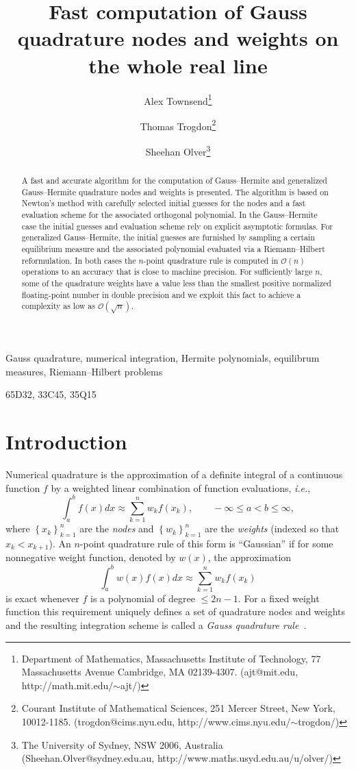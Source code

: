 \documentclass[final]{siamltex}
\title{Fast computation of Gauss quadrature nodes and weights on the whole real line}
\author{Alex Townsend\thanks{Department of Mathematics, Massachusetts Institute of Technology, 77 Massachusetts Avenue
Cambridge, MA 02139-4307. (ajt@mit.edu, http://math.mit.edu/$\sim$ajt/)}
\and Thomas Trogdon\thanks{Courant Institute of Mathematical Sciences, 251 Mercer Street, New York, 10012-1185. 
(trogdon@cims.nyu.edu, http://www.cims.nyu.edu/$\sim$trogdon/)} \and 
Sheehan Olver\thanks{The University of Sydney, NSW 2006, Australia (Sheehan.Olver@sydney.edu.au, http://www.maths.usyd.edu.au/u/olver/)  }
}
\begin{document}
\maketitle

\begin{abstract} 
A fast and accurate algorithm for the computation of Gauss--Hermite and generalized Gauss--Hermite quadrature nodes and weights is presented. The algorithm is based on 
Newton's method with carefully selected initial guesses for the nodes and a fast evaluation scheme for the associated orthogonal polynomial.  
In the Gauss--Hermite case the initial guesses and evaluation scheme rely on explicit asymptotic formulas. For generalized Gauss--Hermite, the 
initial guesses are furnished by sampling a certain equilibrium measure and the associated polynomial
evaluated via a Riemann--Hilbert reformulation. In both cases the $n$-point quadrature rule
is computed in $\mathcal{O}(n)$ operations to an accuracy that is close to machine precision.  For sufficiently large $n$, some of the quadrature weights have a value less than the smallest positive normalized floating-point number in double precision and we exploit this fact to 
achieve a complexity as low as $\mathcal{O}(\sqrt{n})$.
\end{abstract}

\begin{keywords}
Gauss quadrature, numerical integration, Hermite polynomials, equilibrum measures, Riemann--Hilbert problems
\end{keywords}

\begin{AMS}
65D32, 33C45, 35Q15
\end{AMS}

\section{Introduction}
Numerical quadrature is the approximation of a definite integral of a continuous function $f$ by a weighted linear 
combination of function evaluations, \emph{i.e.}, 
\[
\int_{a}^b f(x) dx \approx \sum_{k = 1}^n w_k f(x_k),  \qquad -\infty \leq a< b \leq \infty,
\]
where $\left\{x_k\right\}_{k=1}^n$ are the {\em nodes} and $\left\{w_k\right\}_{k=1}^n$ are the {\em weights} (indexed so that $x_k<x_{k+1}$). 
An $n$-point quadrature rule of this form is ``Gaussian'' if for some nonnegative weight function, denoted by $w(x)$, the approximation 
\[
\int_{a}^b w(x)f(x) dx \approx \sum_{k = 1}^n w_k f(x_k)
\]
is exact whenever $f$ is a polynomial of degree $\leq 2n-1$. For a fixed weight function this requirement uniquely 
defines a set of quadrature nodes and weights and the resulting integration scheme is called a {\em Gauss quadrature rule}~\cite[Sec.~4.6]{NumericalRecipes}. 
\end{document}
